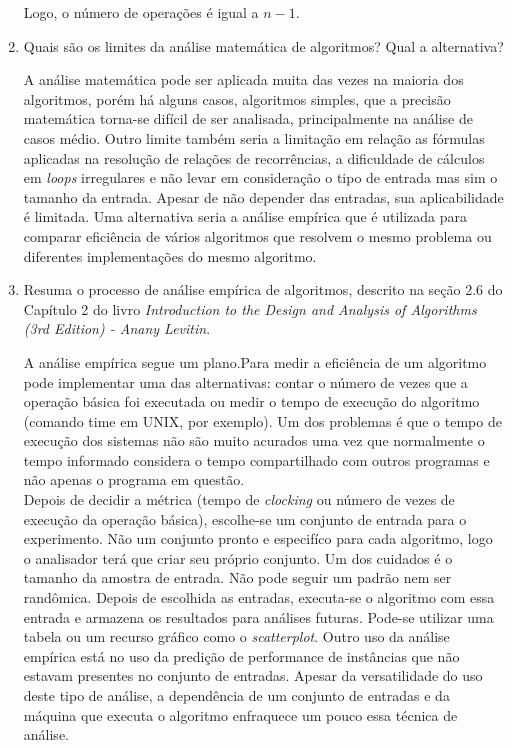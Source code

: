 \documentclass[12pt,a4paper]{article}
\begin{document}
\begin{enumerate}
	Logo, o número de operações é igual a $n-1$.
	
	\item Quais são os limites da análise matemática de algoritmos? Qual a alternativa?
	
	A análise matemática pode ser aplicada muita das vezes na maioria dos algoritmos, porém há alguns casos, algoritmos simples, que a precisão matemática torna-se difícil de ser analisada, principalmente na análise de casos médio. Outro limite também seria a limitação em relação as fórmulas aplicadas na resolução de relações de recorrências, a dificuldade de cálculos em \textit{loops} irregulares e não levar em consideração o tipo de entrada mas sim o tamanho da entrada. Apesar de não depender das entradas, sua aplicabilidade é limitada. Uma alternativa seria a análise empírica que é utilizada para comparar eficiência de vários algoritmos que resolvem o mesmo problema ou diferentes implementações do mesmo algoritmo.	
	
	
	\item Resuma o processo de análise empírica de algoritmos, descrito na seção 2.6 do Capítulo 2 do livro \textit{Introduction to the Design and Analysis of Algorithms (3rd Edition) - Anany Levitin}.
	
	A análise empírica segue um plano.Para medir a eficiência de um algoritmo pode implementar uma das alternativas: contar o número de vezes que a operação básica foi executada ou medir o tempo de execução do algoritmo (comando time em UNIX, por exemplo). Um dos problemas é que o tempo de execução dos sistemas não são muito acurados uma vez que normalmente o tempo informado considera o tempo compartilhado com outros programas e não apenas o programa em questão.\\
	Depois de decidir a métrica (tempo de \textit{clocking} ou número de vezes de execução da operação básica), escolhe-se um conjunto de entrada para o experimento. Não um conjunto pronto e especifíco para cada algoritmo, logo o analisador terá que criar seu próprio conjunto. Um dos cuidados é o tamanho da amostra de entrada. Não pode seguir um padrão nem ser randômica.  
	Depois de escolhida as entradas, executa-se o algoritmo com essa entrada e armazena os resultados para análises futuras. Pode-se utilizar uma tabela ou um recurso gráfico como o \textit{scatterplot}. 
	Outro uso da análise empírica está no uso da predição de performance de instâncias que não estavam presentes no conjunto de entradas. Apesar da versatilidade do uso deste tipo de análise, a dependência de um conjunto de entradas e da máquina que executa o algoritmo enfraquece um pouco essa técnica de análise.
	

\end{enumerate}
\end{document}
